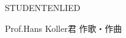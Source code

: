 \documentclass[10pt,b5j]{tarticle} %
\begin{document}
\begin{minipage}[c]{0.7\hsize} %
    \begin{center}
        {\LARGE
            STUDENTENLIED %
        }
        {\small 
        }
    \end{center}
\end{minipage}
\begin{minipage}[c]{0.3\hsize} %
    \begin{flushright} %
        Prof.Hans Koller君 作歌・作曲 %
    \end{flushright}
\end{minipage}
\end{document}
